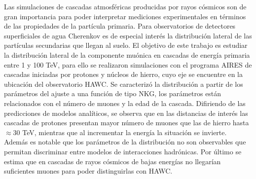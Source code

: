 Las simulaciones de cascadas atmosf\'ericas producidas por rayos c\'osmicos son de gran importancia para poder interpretar mediciones experimentales en t\'erminos de las propiedades de la part\'icula primaria. Para observatorios de detectores superficiales de agua Cherenkov es de especial inter\'es la distribuci\'on lateral de las part\'iculas secundarias que llegan al suelo. El objetivo de este trabajo es estudiar la distribuci\'on lateral de la componente mu\'onica en cascadas de energ\'ia primaria entre 1 y 100 TeV, para ello se realizaron simulaciones con el programa AIRES de cascadas iniciadas por protones y n\'ucleos de hierro, cuyo eje se encuentre en la ubicaci\'on del observatorio HAWC. Se caracteriz\'o la distribuci\'on a partir de los par\'ametros del ajuste a una funci\'on de tipo NKG, los par\'ametros est\'an relacionados con el n\'umero de muones y la edad de la cascada. Difiriendo de las predicciones de modelos anal\'iticos, se observa que en las distancias de inter\'es las cascadas de protones presentan mayor n\'umero de muones que las de hierro hasta $\approx 30$ TeV, mientras que al incrementar la energ\'ia la situaci\'on se invierte. Adem\'as es notable que los par\'ametros de la distribuci\'on no son observables que permitan discriminar entre modelos de interacciones hadr\'onicas. Por \'ultimo se estima que en cascadas de rayos c\'osmicos de bajas energ\'ias no llegar\'ian suficientes muones para poder distinguirlas con HAWC.

\vfill
 
\singlespacing